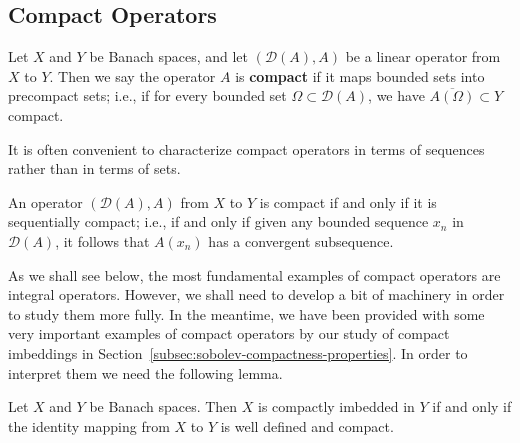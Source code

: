 \subsection{Compact Operators}\label{sec:compact-operators}\label{sec:integral-operators}

\begin{Definition}
\label{def:compact-operator}
Let $X$ and $Y$ be Banach spaces, and let $(\mathcal{D}(A),A)$ be a linear operator from $X$ to $Y$. Then we say the operator $A$ is \textbf{compact} if it maps bounded sets into precompact sets; i.e., if for every bounded set $\Omega\subset\mathcal{D}(A)$, we have $\overline{A(\Omega)}\subset Y$ compact.
\end{Definition}

It is often convenient to characterize compact operators in terms of sequences rather than in terms of sets.

\begin{Theorem}
\label{thm:compact-operator-sequential-characterization}
An operator $(\mathcal{D}(A),A)$ from $X$ to $Y$ is compact if and only if it is sequentially compact; i.e., if and only if given any bounded sequence $x_n$ in $\mathcal{D}(A)$, it follows that $A(x_n)$ has a convergent subsequence.
\end{Theorem}

\begingroup
{}
\renewcommand{\endProof}{\par\nobreak\hfill$\blacksquare$\par\vspace{0.1cm}}
\endgroup

As we shall see below, the most fundamental examples of compact operators are integral operators. However, we shall need to develop a bit of machinery in order to study them more fully. In the meantime, we have been provided with some very important examples of compact operators by our study of compact imbeddings in Section~\ref{subsec:sobolev-compactness-properties}. In order to interpret them we need the following lemma.

\begin{Lemma}
\label{lem:compact-embedding-identity-operator}
Let $X$ and $Y$ be Banach spaces. Then $X$ is compactly imbedded in $Y$ if and only if the identity mapping from $X$ to $Y$ is well defined and compact.
\end{Lemma}

